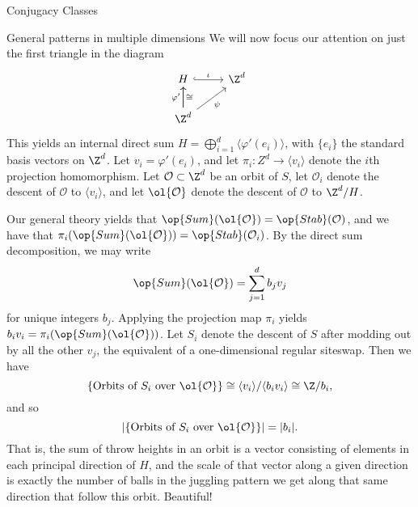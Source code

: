 \documentclass[12nt]{article}
\theoremstyle{plain}
\begin{document}
\begin{subsection}{Conjugacy Classes}
\begin{subsection}{General patterns in multiple dimensions}
We will now focus our attention on just the first triangle in the diagram
\[
\begin{tikzcd}
H  \ar[r, hookrightarrow, "\iota"] & \Z^d \\
\Z^d \ar[u, "\varphi'"] \ar[u, "\cong"'] \ar[ur, "\psi"']
\end{tikzcd}
\]
This yields an internal direct sum $H = \bigoplus \limits_{i=1}^d \langle \varphi'(e_i) \rangle$, with $\{e_i\}$ the standard basis vectors on $\Z^d$. Let $v_i = \varphi'(e_i)$, and let $\pi_i : Z^d \to \langle v_i \rangle$ denote the $i$th projection homomorphism. Let $\mathcal{O} \subset \Z^d$ be an orbit of $S$, let $\mathcal{O}_i$ denote the descent of $\mathcal{O}$ to $\langle v_i \rangle$, and let $\ol{\mathcal{O}}$ denote the descent of $\mathcal{O}$ to $\Z^d/H$. 

Our general theory yields that $\op{Sum}(\ol{\mathcal{O}}) = \op{Stab}(\mathcal{O})$, and we have that $\pi_i(\op{Sum}(\ol{\mathcal{O}})) = \op{Stab}(\mathcal{O}_i)$. By the direct sum decomposition, we may write 
\[
\op{Sum}(\ol{\mathcal{O}}) = \sum \limits_{j=1}^d b_j v_j 
\]
for unique integers $b_j$. Applying the projection map $\pi_i$ yields $b_i v_i = \pi_i(\op{Sum}(\ol{\mathcal{O}}))$. Let $S_i$ denote the descent of $S$ after modding out by all the other $v_j$, the equivalent of a one-dimensional regular siteswap. Then we have 
\[
\{\text{Orbits of } S_i \text{ over } \ol{\mathcal{O}} \} \cong \langle v_i \rangle/ \langle b_i v_i \rangle \cong \Z/b_i,
\]
and so
\[
|\{\text{Orbits of } S_i \text{ over } \ol{\mathcal{O}} \}| = |b_i|.
\]
That is, the sum of throw heights in an orbit is a vector consisting of elements in each principal direction of $H$, and the scale of that vector along a given direction is exactly the number of balls in the juggling pattern we get along that same direction that follow this orbit. Beautiful!
\end{subsection}
%

\end{subsection}
\end{document}

